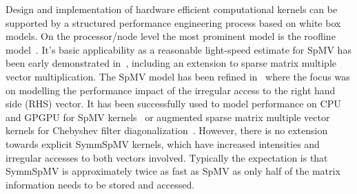 Design and implementation of hardware efficient computational kernels can be supported by a structured performance engineering process based on white box models. On the processor/node level the most prominent model is the roofline model~\cite{Williams_roofline}. It's basic applicability as a reasonable light-speed estimate for \acrshort{SpMV} has been early demonstrated in~\cite{Gropp:1999}, including an extension to {\GW sparse matrix multiple vector multiplication}. The \acrshort{SpMV} model has been refined in~\cite{Moritz_sell} where the focus was on modelling the performance impact of the irregular access to the {\GW right hand side (RHS)} vector. It has been successfully used to model performance on CPU and GPGPU for \acrshort{SpMV} kernels~\cite{Moritz_sell} or augmented sparse matrix multiple vector kernels for Chebyshev filter diagonalization~\cite{ISC2018:ChebFD}. However, there is no extension towards explicit \acrshort{SymmSpMV} kernels, which have increased intensities and irregular accesses to both vectors involved. Typically the expectation is that \acrshort{SymmSpMV} is approximately twice as fast as \acrshort{SpMV} as only half of the matrix information needs to be stored and accessed. 

